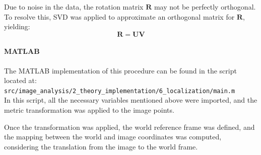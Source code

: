 \documentclass{Academic}
\begin{document}
Due to noise in the data, the rotation matrix $\mathbf{R}$ may not be perfectly orthogonal. 
To resolve this, SVD was applied to approximate an orthogonal matrix for $\mathbf{R}$, yielding:
\begin{equation}\mathbf{R} = \mathbf{UV} \end{equation}

\paragraph*{MATLAB}
The MATLAB implementation of this procedure can be found in the script located at: \\ 
\texttt{src/image\_analysis/2\_theory\_implementation/6\_localization/main.m} \\
In this script, all the necessary variables mentioned above were imported, and the metric transformation was applied to the image points.

Once the transformation was applied, the world reference frame was defined, and the mapping between the world and image coordinates was computed, considering the translation from the image to the world frame.
\end{document}

